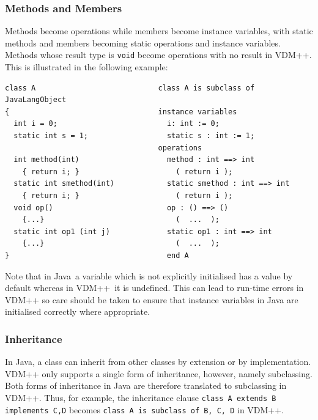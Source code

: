\documentclass[\pformat,12pt]{article}
\newcommand{\JAVA}{Java}
\newcommand{\VDM}{VDM++}
\begin{document}
\subsubsection{Methods and Members}\label{methods}

Methods become operations while members become instance variables,
with static methods and members becoming static operations and 
instance variables. Methods whose result type is \texttt{void}
become operations with no result in VDM++. This is illustrated in
the following example:  

\begin{small}
\begin{verbatim}
class A                            class A is subclass of JavaLangObject
{                                  instance variables
  int i = 0;                         i: int := 0;
  static int s = 1;                  static s : int := 1;
                                   operations
  int method(int)                    method : int ==> int
    { return i; }                      ( return i );
  static int smethod(int)            static smethod : int ==> int
    { return i; }                      ( return i );
  void op()                          op : () ==> ()
    {...}                              (  ...  );
  static int op1 (int j)             static op1 : int ==> int
    {...}                              (  ...  );
}                                    end A
\end{verbatim}
\end{small}

Note that in \JAVA\ a variable which is not explicitly initialised has
a value by default whereas in \VDM\ it is undefined. This can lead to
run-time errors in VDM++ so care should be taken to ensure that
instance variables in Java are initialised correctly where appropriate.


\subsubsection{Inheritance}\label{inheritance}

In \JAVA{}, a class can inherit from other classes by extension or by
implementation. VDM++ only supports a single form of inheritance,
however, namely subclassing. Both forms of inheritance in Java are 
therefore translated to subclassing in VDM++. Thus, for example, the
inheritance clause \texttt{class A extends B implements C,D} becomes
\texttt{class A is subclass of B, C, D} in VDM++.
\end{document}
